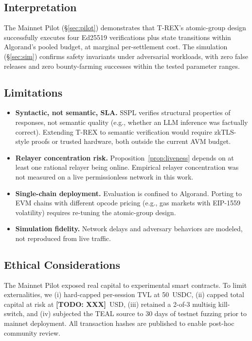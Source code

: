 \documentclass[journal]{IEEEtran}
\newcommand{\TODO}[1]{{\color{red}\textbf{[TODO: #1]}}}
\begin{document}
\subsection{Interpretation}
The Mainnet Pilot (\S\ref{sec:pilot}) demonstrates that T-REX's atomic-group design successfully executes four Ed25519 verifications plus state transitions within Algorand's pooled budget, at marginal per-settlement cost. The simulation (\S\ref{sec:sim}) confirms safety invariants under adversarial workloads, with zero false releases and zero bounty-farming successes within the tested parameter ranges.

\subsection{Limitations}
\begin{itemize}[leftmargin=*]
    \item \textbf{Syntactic, not semantic, SLA.} SSPL verifies structural properties of responses, not semantic quality (e.g., whether an LLM inference was factually correct). Extending T-REX to semantic verification would require zkTLS-style proofs or trusted hardware, both outside the current AVM budget.
    \item \textbf{Relayer concentration risk.} Proposition~\ref{prop:liveness} depends on at least one rational relayer being online. Empirical relayer concentration was not measured on a live permissionless network in this work.
    \item \textbf{Single-chain deployment.} Evaluation is confined to Algorand. Porting to EVM chains with different opcode pricing (e.g., gas markets with EIP-1559 volatility) requires re-tuning the atomic-group design.
    \item \textbf{Simulation fidelity.} Network delays and adversary behaviors are modeled, not reproduced from live traffic.
\end{itemize}

\subsection{Ethical Considerations}
The Mainnet Pilot exposed real capital to experimental smart contracts. To limit externalities, we (i) hard-capped per-session TVL at 50~USDC, (ii) capped total capital at risk at \TODO{XXX}~USD, (iii) retained a 2-of-3 multisig kill-switch, and (iv) subjected the TEAL source to 30 days of testnet fuzzing prior to mainnet deployment. All transaction hashes are published to enable post-hoc community review.
\end{document}

